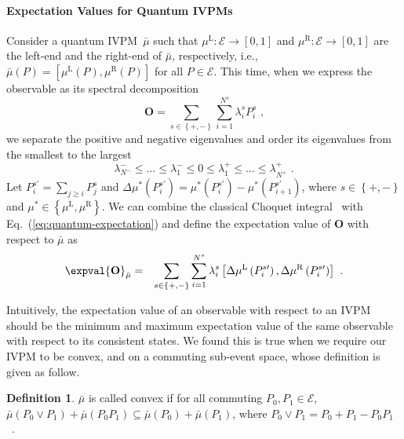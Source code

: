 \documentclass[english,reprint, aps, prl,superscriptaddress, showpacs,
showkeys, longbibliography, amsmath, amssymb]{revtex4-1}
\theoremstyle{plain}
\theoremstyle{definition}
\newtheorem{definition}[thm]{Definition}
\newcommand{\events}{\ensuremath{\mathcal{E}}}
\newcommand{\mul}{\ensuremath{\mu^{\mathrm{L}}}}
\newcommand{\mur}{\ensuremath{\mu^{\mathrm{R}}}}
\begin{document}
\paragraph{Expectation Values for Quantum IVPMs}

Consider a quantum IVPM~$\bar{\mu}$ such that $\mul:\events\rightarrow\left[0,1\right]$
and $\mur:\events\rightarrow\left[0,1\right]$ are the left-end and
the right-end of $\bar{\mu}$, respectively, i.e., $\bar{\mu}\left(P\right)=\left[\mul\left(P\right),\mur\left(P\right)\right]$
for all $P\in\events$. This time, when we express the observable
as its spectral decomposition
\begin{equation}
\mathbf{O}=\sum_{s\in\left\{ +,-\right\} }\sum_{i=1}^{N^{s}}\lambda_{i}^{s}P_{i}^{s}\textrm{ ,}\label{eq:spectrum-decomposition}
\end{equation}
we separate the positive and negative eigenvalues and order its eigenvalues
from the smallest to the largest 
\begin{equation}
\lambda_{N^{-}}^{-}\le\ldots\le\lambda_{1}^{-}\le0\le\lambda_{1}^{+}\le\ldots\le\lambda_{N^{+}}^{+}\textrm{ .}
\end{equation}
Let $P_{i}^{s\prime}=\sum_{j\ge i}P_{j}^{s}$ and $\Delta\mu^{*}\left(P_{i}^{s\prime}\right)=\mu^{*}\left(P_{i}^{s\prime}\right)-\mu^{*}\left(P_{i+1}^{s\prime}\right)$,
where $s\in\left\{ +,-\right\} $ and $\mu^{*}\in\left\{ \mul,\mur\right\} $.
We can combine the classical Choquet integral~\cite{Vitali1925,Choquet1954,GilboaSchmeidler1994,Grabisch2016}
with Eq.~(\ref{eq:quantum-expectation}) and define the expectation
value of $\mathbf{O}$ with respect to $\bar{\mu}$ as
\begin{eqnarray}
\expval{\mathbf{O}}_{\bar{\mu}} & = & \sum_{s\in\left\{ +,-\right\} }\sum_{i=1}^{N^{s}}\lambda_{i}^{s}\left[\Delta\mul\left(P_{i}^{s\prime}\right),\Delta\mur\left(P_{i}^{s\prime}\right)\right]\textrm{ .}\label{eq:quantum-interval-expectation}
\end{eqnarray}

Intuitively, the expectation value of an observable with respect to
an IVPM should be the minimum and maximum expectation value of the
same observable with respect to its consistent states. We found this
is true when we require our IVPM to be convex, and on a commuting
sub-event space, whose definition is given as follow.

\begin{definition}$\bar{\mu}$ is called convex if for all commuting
$P_{0},P_{1}\in\events$, $\bar{\mu}\left(P_{0}\vee P_{1}\right)+\bar{\mu}\left(P_{0}P_{1}\right)\subseteq\bar{\mu}\left(P_{0}\right)+\bar{\mu}\left(P_{1}\right)$,
where $P_{0}\vee P_{1}=P_{0}+P_{1}-P_{0}P_{1}$~\cite{Griffiths2003}.\end{definition}
\end{document}
